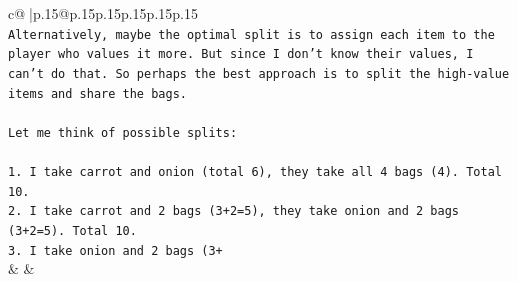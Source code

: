 \documentclass{article}
\begin{document}
{\begin{supertabular}{c@{$\;$}|p{.15\linewidth}@{}p{.15\linewidth}p{.15\linewidth}p{.15\linewidth}p{.15\linewidth}p{.15\linewidth}}
{{{\\ 
\texttt{Alternatively, maybe the optimal split is to assign each item to the player who values it more. But since I don't know their values, I can't do that. So perhaps the best approach is to split the high{-}value items and share the bags.} \\
\\ 
\texttt{Let me think of possible splits:} \\
\\ 
\texttt{1. I take carrot and onion (total 6), they take all 4 bags (4). Total 10.} \\
\texttt{2. I take carrot and 2 bags (3+2=5), they take onion and 2 bags (3+2=5). Total 10.} \\
\texttt{3. I take onion and 2 bags (3+} \\
            }
        }
    }
    & & \\ \\


\end{supertabular}}
\end{document}
